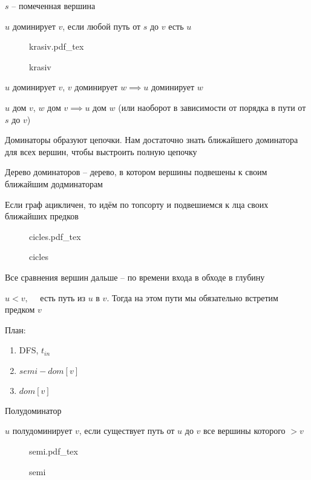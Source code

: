 \documentclass{book}
\theoremstyle{definition}
\newcommand{\incfig}[1]{%
    \def\svgwidth{\columnwidth}
    {#1.pdf_tex}
}
\begin{document}
\begin{definition}
     $s$ -- помеченная вершина
    
    $u$ доминирует $v$, если любой путь от $s$ до  $v$ есть  $u$
\end{definition}


\begin{figure}[!ht]
    \centering
    \incfig{krasiv}
    \caption{krasiv}
    \label{fig:krasiv}
\end{figure}

\begin{property}
    $u$ доминирует  $v$, $v$ доминирует  $w \implies u $ доминирует $w$ 

    $u$ дом  $v$,  $w$ дом  $v \implies u$ дом $w$ (или наоборот в зависимости от порядка в пути от  $s$ до  $v$)

    Доминаторы образуют цепочки. Нам достаточно знать ближайшего доминатора для всех вершин, чтобы выстроить полную цепочку

    Дерево доминаторов -- дерево, в котором вершины подвешены к своим ближайшим додминаторам

    Если граф ацикличен, то идём по топсорту и подвешиемся к лца своих ближайших предков
\end{property}

\begin{figure}[!ht]
    \centering
    \incfig{cicles}
    \caption{cicles}
    \label{fig:cicles}
\end{figure}

Все сравнения вершин дальше -- по времени входа в обходе в глубину

\begin{lemma}
    $u<v, \quad$ есть путь из  $u$ в  $v$. Тогда на этом пути мы обязательно встретим предком  $v$
\end{lemma}

План:
\begin{enumerate}
    \item DFS, $t_{in}$
    \item $semi-dom[v]$
    \item  $dom[v]$
\end{enumerate}

\begin{definition}
    Полудоминатор

    $u$ полудоминирует  $v$, если существует путь от  $u$ до $v$ все вершины которого $>v$
\end{definition}

\begin{figure}[!ht]
    \centering
    \incfig{semi}
    \caption{semi}
    \label{fig:semi}
\end{figure}
\end{document}
